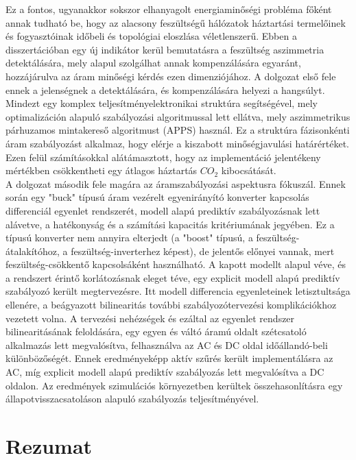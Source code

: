 Ez a fontos, ugyanakkor sokszor elhanyagolt energiaminőségi probléma főként annak tudható be, hogy az alacsony feszültségű hálózatok háztartási termelőinek és fogyasztóinak időbeli és topológiai eloszlása véletlenszerű. Ebben a disszertációban egy új indikátor kerül bemutatásra a feszültség aszimmetria detektálására, mely alapul szolgálhat annak kompenzálására egyaránt, hozzájárulva az áram minőségi kérdés ezen dimenziójához. A dolgozat első fele ennek a jelenségnek a detektálására, és kompenzálására helyezi a hangsúlyt. Mindezt egy komplex teljesítményelektronikai struktúra segítségével, mely optimalizáción alapuló szabályozási algoritmussal lett ellátva, mely aszimmetrikus párhuzamos mintakereső algoritmust (APPS) használ. Ez a struktúra fázisonkénti áram szabályozást alkalmaz, hogy elérje a kiszabott minőségjavulási határértéket. Ezen felül számításokkal alátámasztott, hogy az implementáció jelentékeny mértékben csökkentheti egy átlagos háztartás $CO_2$ kibocsátását.\\
A dolgozat második fele magára az áramszabályozási aspektusra fókuszál. Ennek során egy "buck" típusú áram vezérelt egyenirányító konverter kapcsolás differenciál egyenlet rendszerét, modell alapú prediktív szabályozásnak lett alávetve, a hatékonyság és a számítási kapacitás kritériumának jegyében. Ez a típusú konverter nem annyira elterjedt (a "boost" típusú, a feszültség-átalakítóhoz, a feszültség-inverterhez képest), de jelentős előnyei vannak, mert feszültség-csökkentő kapcsolsáként használható. A kapott modellt alapul véve, és a rendszert érintő korlátozásnak eleget téve, egy explicit modell alapú prediktív szabályozó került megtervezésre. Itt modell differencia egyenleteinek letisztultsága ellenére, a beágyazott bilinearitás további szabályozótervezési komplikációkhoz vezetett volna. A tervezési nehézségek és ezáltal az egyenlet rendszer bilinearitásának feloldására, egy egyen és váltó áramú oldalt szétcsatoló alkalmazás lett megvalósítva, felhasználva az AC és DC oldal időállandó-beli különbözőségét. Ennek eredményeképp aktív szűrés került implementálásra az AC, míg explicit modell alapú prediktív szabályozás lett megvalósítva a DC oldalon. Az eredmények szimulációs környezetben kerültek összehasonlításra egy állapotvisszacsatoláson alapuló szabályozás teljesítményével.

\chapter*{Rezumat}

